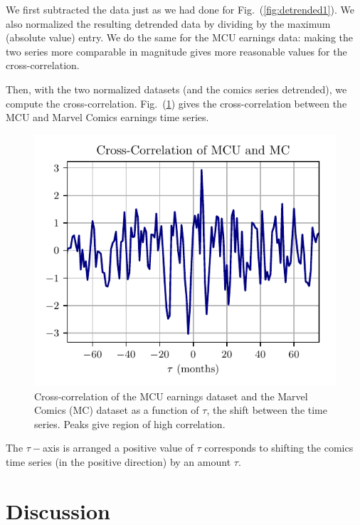 \documentclass[12pt]{article}
\begin{document}
We first subtracted the data just as we had done for Fig.~(\ref{fig:detrended1}).  We also normalized the resulting detrended data by dividing by the maximum (absolute value) entry.  We do the same for the MCU earnings data: making the two series more comparable in magnitude gives more reasonable values for the cross-correlation.

Then, with the two normalized datasets (and the comics series detrended), we compute the cross-correlation. Fig.~(\ref{fig:correlation1}) gives the cross-correlation between the MCU and Marvel Comics earnings time series.
\begin{figure}[h]
    \centering
    \includegraphics{figures/correlation1.pdf}
    \caption{Cross-correlation of the MCU earnings dataset and the Marvel Comics (MC) dataset as a function of $\tau$, the shift between the time series.  Peaks give region of high correlation.}\label{fig:correlation1}
\end{figure}
The $\tau-$axis is arranged a positive value of $\tau$ corresponds to shifting the comics time series (in the positive direction) by an amount $\tau$.

\section{Discussion}
\end{document}
